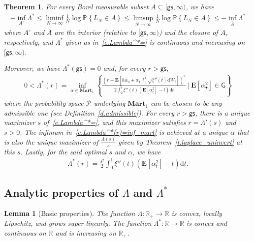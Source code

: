 \documentclass[11pt]{amsart}
\newtheorem{theorem}[proposition]{Theorem}
\newtheorem{lemma}[proposition]{Lemma}
\theoremstyle{remark}
\theoremstyle{definition}
\numberwithin{equation}{section}
\numberwithin{proposition}{section}
\numberwithin{figure}{section}
\numberwithin{table}{section}
\newcommand{\R}{\mathbb{R}}
\renewcommand{\P}{\mathbb{P}}
\newcommand{\EE}{\mathbf{E}}
\renewcommand{\leq}{\leqslant}
\renewcommand{\subset}{\subseteq}
\renewcommand{\bar}{\overline}
\newcommand{\Ll}{\left}
\newcommand{\Rr}{\right}
\renewcommand{\d}{\mathrm{d}}
\newcommand{\1}{\mathbf{1}}
\newcommand{\msf}{\mathsf}
\newcommand{\msc}{\mathscr}
\newcommand{\bmart}{\mathbf{Mart}}
\newcommand{\gs}{\msf {gs}}
\begin{document}
\begin{theorem}\label{t.LDP}
For every Borel measurable subset $A\subset [\gs,\infty)$, we have
\begin{align}\label{e.t.LDP}
    -\inf_{A^\circ}\Lambda^*\leq \liminf_{N\to\infty}\frac{1}{N}\log \P\Ll\{L_N\in A\Rr\}\leq \limsup_{N\to\infty}\frac{1}{N}\log \P\Ll\{L_N\in A\Rr\} \leq  -\inf_{\bar A}\Lambda^*
\end{align}
where $A^\circ$ and $\bar A$ are the interior (relative to $[\gs,\infty)$) and the closure of $A$, respectively, and $\Lambda^*$ given as in~\eqref{e.Lambda^*=} is continuous and increasing on $[\gs,\infty)$.

Moreover, we have $\Lambda^*(\gs)=0$ and, for every $r>\gs$,
\begin{align}\label{e.Lambda^*(r)=inf_mart}
    0<\Lambda^*(r)= \inf_{\alpha\in\bmart_1}\Ll\{\frac{\Ll(r-\EE\Ll[h\alpha_0+\alpha_1\int_0^1\sqrt{\xi''(t)}\d W_t\Rr]\Rr)^2}{2\int_0^1\xi''(t)\Ll(\EE\Ll[\alpha^2_t\Rr]-t\Rr)\d t}\ \Bigg|\ \EE\Ll[\alpha^2_\bullet\Rr]\in \msf G\Rr\}
\end{align}
where the probability space $\msc P$ underlying $\bmart_1$ can be chosen to be any admissible one  (see Definition~\ref{d.admissible}).
For every $r>\gs$, there is a unique maximizer $s$ of~\eqref{e.Lambda^*=}, and this maximizer satisfies $r=\Lambda'(s)$ and $s>0$. The infimum in~\eqref{e.Lambda^*(r)=inf_mart} is achieved at a unique $\alpha$ that is also the unique maximizer of $\frac{\Lambda(s)}{s}$ given by Theorem~\ref{t.laplace_uninvert} at this $s$. Lastly, for the said optimal $s$ and $\alpha$, we have
\begin{align}\label{e.Lambda^*(r)=..s..alpha}
    \Lambda^*(r)= \frac{s^2}{2}\int_0^1\xi''(t)\Ll(\EE\Ll[\alpha^2_t\Rr]-t\Rr)\d t.
\end{align}
\end{theorem}

\subsection{Analytic properties of \texorpdfstring{$\Lambda$}{Λ} and \texorpdfstring{$\Lambda^*$}{Λ*}}

\begin{lemma}[Basic properties]\label{l.basic_Lambda}
The function $\Lambda:\R_+\to\R$ is convex, locally Lipschitz, and grows super-linearly. The function $\Lambda^*:\R\to\R$ is convex and continuous on $\R$ and is increasing on $\R_+$. %
\end{lemma}
\end{document}
